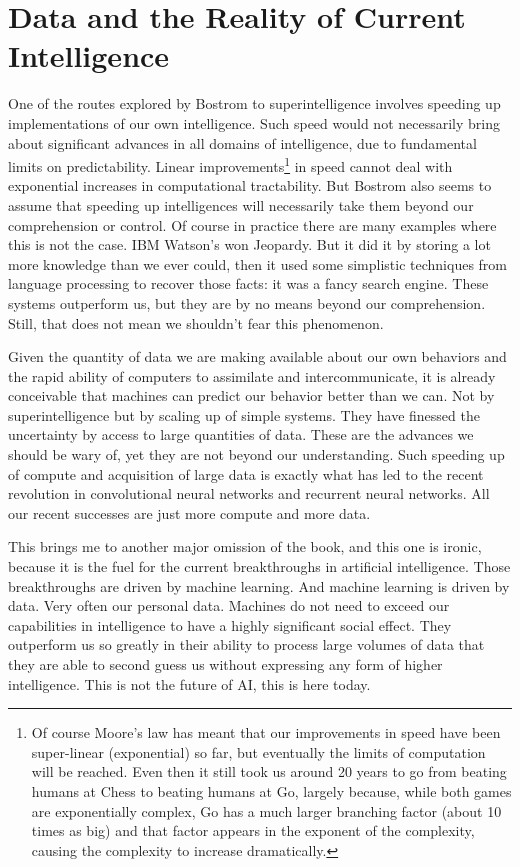 \documentclass[a4paper]{caesar_book}
\begin{document}
\section{Data and the Reality of Current Intelligence}

One of the routes explored by Bostrom to superintelligence involves speeding up implementations of our own intelligence. Such speed would not necessarily bring about significant advances in all domains of intelligence, due to fundamental limits on predictability. Linear improvements\footnote{Of course Moore’s law has meant that our improvements in speed have been super-linear (exponential) so far, but eventually the limits of computation will be reached. Even then it still took us around 20 years to go from beating humans at Chess to beating humans at Go, largely because, while both games are exponentially complex, Go has a much larger branching factor (about 10 times as big) and that factor appears in the exponent of the complexity, causing the complexity to increase dramatically.} in speed cannot deal with exponential increases in computational tractability. But Bostrom also seems to assume that speeding up intelligences will necessarily take them beyond our comprehension or control. Of course in practice there are many examples where this is not the case. IBM Watson’s won Jeopardy. But it did it by storing a lot more knowledge than we ever could, then it used some simplistic techniques from language processing to recover those facts: it was a fancy search engine. These systems outperform us, but they are by no means beyond our comprehension. Still, that does not mean we shouldn’t fear this phenomenon.

Given the quantity of data we are making available about our own behaviors and the rapid ability of computers to assimilate and intercommunicate, it is already conceivable that machines can predict our behavior better than we can. Not by superintelligence but by scaling up of simple systems. They have finessed the uncertainty by access to large quantities of data. These are the advances we should be wary of, yet they are not beyond our understanding. Such speeding up of compute and acquisition of large data is exactly what has led to the recent revolution in convolutional neural networks and recurrent neural networks. All our recent successes are just more compute and more data.

This brings me to another major omission of the book, and this one is ironic, because it is the fuel for the current breakthroughs in artificial intelligence. Those breakthroughs are driven by machine learning. And machine learning is driven by data. Very often our personal data. Machines do not need to exceed our capabilities in intelligence to have a highly significant social effect. They outperform us so greatly in their ability to process large volumes of data that they are able to second guess us without expressing any form of higher intelligence. This is not the future of AI, this is here today.
\end{document}
